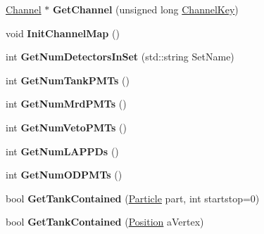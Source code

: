 \begin{DoxyCompactItemize}
\item 
\hypertarget{classGeometry_a68873d502689bb73337c3f8d6e0ef3bf}{\hyperlink{classChannel}{Channel} $\ast$ {\bfseries Get\-Channel} (unsigned long \hyperlink{classChannelKey}{Channel\-Key})}\label{classGeometry_a68873d502689bb73337c3f8d6e0ef3bf}

\item 
\hypertarget{classGeometry_a60e84520417769401492de9e182636fc}{void {\bfseries Init\-Channel\-Map} ()}\label{classGeometry_a60e84520417769401492de9e182636fc}

\item 
\hypertarget{classGeometry_a4354935089665d2856b9a9a5bb1f181a}{int {\bfseries Get\-Num\-Detectors\-In\-Set} (std\-::string Set\-Name)}\label{classGeometry_a4354935089665d2856b9a9a5bb1f181a}

\item 
\hypertarget{classGeometry_a5dd283584b56f19637b114198c810b7d}{int {\bfseries Get\-Num\-Tank\-P\-M\-Ts} ()}\label{classGeometry_a5dd283584b56f19637b114198c810b7d}

\item 
\hypertarget{classGeometry_adc4f55d81e288f3d9c1c9fdf4a8848fe}{int {\bfseries Get\-Num\-Mrd\-P\-M\-Ts} ()}\label{classGeometry_adc4f55d81e288f3d9c1c9fdf4a8848fe}

\item 
\hypertarget{classGeometry_a5b927dcf27fd80c85764ae046836fd8c}{int {\bfseries Get\-Num\-Veto\-P\-M\-Ts} ()}\label{classGeometry_a5b927dcf27fd80c85764ae046836fd8c}

\item 
\hypertarget{classGeometry_a7dbd2d763bd5944732aeb26430ded65b}{int {\bfseries Get\-Num\-L\-A\-P\-P\-Ds} ()}\label{classGeometry_a7dbd2d763bd5944732aeb26430ded65b}

\item 
\hypertarget{classGeometry_aa53bb4913ece4beff2e7bda1070c19a1}{int {\bfseries Get\-Num\-O\-D\-P\-M\-Ts} ()}\label{classGeometry_aa53bb4913ece4beff2e7bda1070c19a1}

\item 
\hypertarget{classGeometry_aca1dd1c2919c14b2d8bdf40db23c5ba9}{bool {\bfseries Get\-Tank\-Contained} (\hyperlink{classParticle}{Particle} part, int startstop=0)}\label{classGeometry_aca1dd1c2919c14b2d8bdf40db23c5ba9}

\item 
\hypertarget{classGeometry_a2c68539bcaaf45158dbcdc50c3f65ca6}{bool {\bfseries Get\-Tank\-Contained} (\hyperlink{classPosition}{Position} a\-Vertex)}\label{classGeometry_a2c68539bcaaf45158dbcdc50c3f65ca6}


\end{DoxyCompactItemize}

